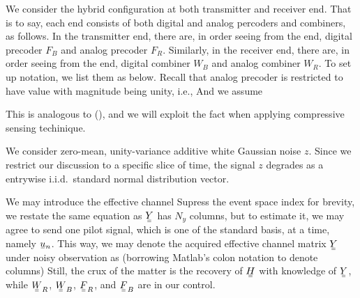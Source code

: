 We consider the hybrid configuration at both transmitter and receiver end.
That is to say, each end consists of both digital and analog percoders and combiners, as follows.
In the transmitter end, there are, in order seeing from the end, digital precoder \(F_B\) and analog precoder \(F_R\).
Similarly, in the receiver end, there are, in order seeing from the end, digital combiner \(W_B\) and analog combiner \(W_R\).
To set up notation, we list them as below.
%
%
Recall that analog precoder is restricted to have value with magnitude being unity, i.e.,
%
%
And we assume

This is analogous to (), and we will exploit the fact when applying compressive sensing techinique.

We consider zero-mean, unity-variance additive white Gaussian noise \(z\).
Since we restrict our discussion to a specific slice of time, the signal \(z\) degrades as a entrywise i.i.d.\ standard normal distribution vector.

We may introduce the effective channel
%
%
Supress the event space index for brevity, we restate the same equation as
%
\(\M{Y}\) has \(N_y\) columns, but to estimate it, we may agree to send one pilot signal, which is one of the standard basis, at a time, namely \(\V{u}_n\).
This way, we may denote the acquired effective channel matrix \(\M{Y}\) under noisy observation as (borrowing Matlab's colon notation to denote columns)
%
%
Still, the crux of the matter is the recovery of \(\M{H}\) with knowledge of \(\M{Y}\), while \(\M{W}_R\), \(\M{W}_B\), \(\M{F}_R\), and \(\M{F}_B\) are in our control.

